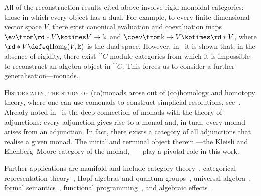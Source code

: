 All of the reconstruction results cited above involve rigid monoidal categories:
those in which every object has a dual.
For example, to every finite-dimensional vector space \(V\),
there exist canonical evaluation and coevaluation maps
\(\ev \from \rd*{V} \kotimes V \to \Bbbk\) and \(\coev\from \Bbbk \to V \kotimes \rd*{V}\),
where \(\rd*{V} \defeq \mathrm{Hom}_{\Bbbk}(V, \Bbbk)\) is the dual space.
However, in~\cite[Example~2.20]{douglas19} it is shown that, in the absence of rigidity,
there exist \(\cat{C}\)\hyp{}module categories from which it is impossible to reconstruct an algebra object in \(\cat{C}\).
This forces us to consider a further generalisation—monads.

\froufrou%

\textsc{Historically, the study of} (co)monads arose out of (co)homology and homotopy theory,
where one can use comonads to construct simplicial resolutions, see~\cite{godement58:topol,huber61:homot}.
Already noted in~\cite{huber61:homot} is the deep connection of monads with the theory of adjunctions:
every adjunction gives rise to a monad
and, in turn, every monad arises from an adjunction.
In fact, there exists a category of all adjunctions that realise a given monad.
The initial and terminal object therein%
—the Kleisli and Eilenberg–Moore category of the monad,~\cite{eilenberg65:adjoin,kleisli65:every}—%
play a pivotal role in this work.

Further applications are manifold and include
category theory~\cite{Beck1969,Street1972,blackwell89:two,lack02,arkor24},
categorical representation theory~\cite{Moerdijk2002,Bruguieres2011,stroinski24:modul-tambar,batista22:como-part},
Hopf algebras and quantum groups~\cite{Bruguieres2007,Aguiar2012,kowalzig15:cyclic,hasegawa-lemay2018:LinearHopf},
universal algebra~\cite{linton66:aspects,walters70:cat-ualg,hyland07},
formal semantics~\cite{moggi89:comput,moggi91:notion,turi97-math-op},
functional programming~\cite{wadler92:compr,wadler93:mon-fun-prog,peytonjones93:imp-fun-prog}, and
algebraic effects~\cite{benton02:monad,plotkin02:notion,plotkin09:handl,bauer15:prog-alg}.

